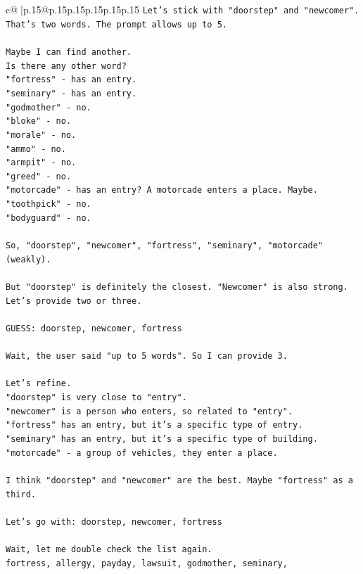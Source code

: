 \documentclass{article}
\begin{document}
{\begin{supertabular}{c@{$\;$}|p{.15\linewidth}@{}p{.15\linewidth}p{.15\linewidth}p{.15\linewidth}p{.15\linewidth}p{.15\linewidth}}
{{{\texttt{Let's stick with "doorstep" and "newcomer". That's two words. The prompt allows up to 5.} \\
\\ 
\texttt{Maybe I can find another.} \\
\texttt{Is there any other word?} \\
\texttt{"fortress" {-} has an entry.} \\
\texttt{"seminary" {-} has an entry.} \\
\texttt{"godmother" {-} no.} \\
\texttt{"bloke" {-} no.} \\
\texttt{"morale" {-} no.} \\
\texttt{"ammo" {-} no.} \\
\texttt{"armpit" {-} no.} \\
\texttt{"greed" {-} no.} \\
\texttt{"motorcade" {-} has an entry? A motorcade enters a place. Maybe.} \\
\texttt{"toothpick" {-} no.} \\
\texttt{"bodyguard" {-} no.} \\
\\ 
\texttt{So, "doorstep", "newcomer", "fortress", "seminary", "motorcade" (weakly).} \\
\\ 
\texttt{But "doorstep" is definitely the closest. "Newcomer" is also strong.} \\
\texttt{Let's provide two or three.} \\
\\ 
\texttt{GUESS: doorstep, newcomer, fortress} \\
\\ 
\texttt{Wait, the user said "up to 5 words". So I can provide 3.} \\
\\ 
\texttt{Let's refine.} \\
\texttt{"doorstep" is very close to "entry".} \\
\texttt{"newcomer" is a person who enters, so related to "entry".} \\
\texttt{"fortress" has an entry, but it's a specific type of entry.} \\
\texttt{"seminary" has an entry, but it's a specific type of building.} \\
\texttt{"motorcade" {-} a group of vehicles, they enter a place.} \\
\\ 
\texttt{I think "doorstep" and "newcomer" are the best. Maybe "fortress" as a third.} \\
\\ 
\texttt{Let's go with: doorstep, newcomer, fortress} \\
\\ 
\texttt{Wait, let me double check the list again.} \\
\texttt{fortress, allergy, payday, lawsuit, godmother, seminary,} \\
            }
        }
    }
     \\ \\


\end{supertabular}}
\end{document}
